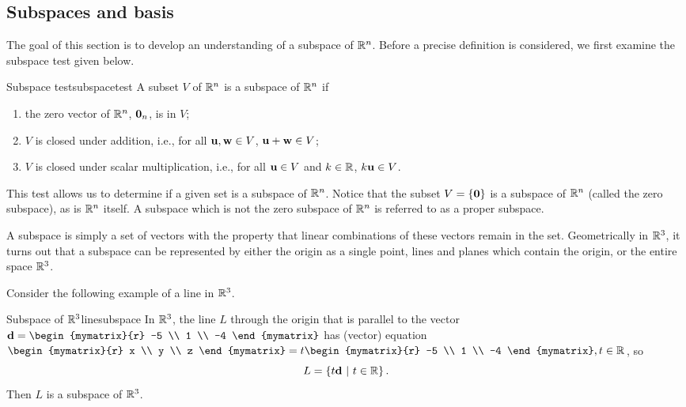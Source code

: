 \subsection{Subspaces and basis}

The goal of this section is to develop an understanding of a subspace of $\mathbb{R}^n$. Before a precise definition is considered, we first examine the subspace test given below.

\begin{theorem}{Subspace test}{subspacetest}
A subset $V$ of $\mathbb{R}^n$ is a subspace of $\mathbb{R}^n$ if 
\begin{enumerate}
\item the zero vector of $\mathbb{R}^n$, ${\bf 0}_n$, is in $V$;
\item $V$ is closed under addition, i.e., for all ${\bf u},{\bf w}\in V$, ${\bf u}+{\bf w}\in V$;
\item $V$ is closed under scalar multiplication, i.e., for all ${\bf u}\in V$
and $k\in\mathbb{R}$, $k{\bf u}\in V$.
\end{enumerate}
\end{theorem}

This test allows us to determine if a given set is a subspace of $\mathbb{R}^n$. Notice that the subset $V = \left\{{\bf 0} \right\}$ is a subspace of $\mathbb{R}^n$ (called the zero subspace), as is $\mathbb{R}^n$ itself. A subspace which is not the zero subspace of $\mathbb{R}^n$ is referred to as a proper subspace.

 A subspace is simply a set of vectors with the property that linear
combinations of these vectors remain in the set. Geometrically in
$\mathbb{R}^{3}$, it turns out that a subspace can be represented by
either the origin as a single point, lines and planes which contain
the origin, or the entire space $\mathbb{R}^{3}$. 

Consider the following example of a line in $\mathbb{R}^3$. 

\begin{example}{Subspace of $\mathbb{R}^3$}{linesubspace}
In $\mathbb{R}^3$, the line $L$ through the origin that is
parallel to the vector
${\vect{d}}= \begin{mymatrix}{r} -5 \\ 1 \\ -4 \end{mymatrix}$ 
has (vector) equation
$\begin{mymatrix}{r} x \\ y \\ z \end{mymatrix}
=t\begin{mymatrix}{r} -5 \\ 1 \\ -4 \end{mymatrix}, t\in\R$,
so 
\[ L=\left\{t{{\bf d}} ~|~ t\in\mathbb{R}\right\}.\] Then $L$ is a subspace of $\mathbb{R}^3$.  
\end{example}

